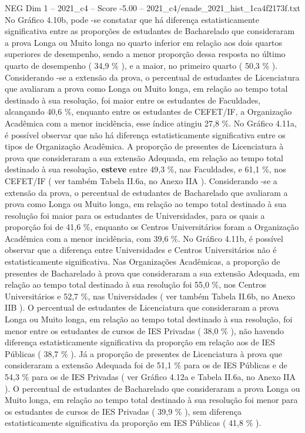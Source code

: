 \begin{textsample}{NEG Dim 1 – 2021\_c4 – Score -5.00 – 2021\_c4/enade\_2021\_hist\_1ca4f2173f.txt}
No Gráfico 4.10b, pode -se constatar que há diferença estatisticamente significativa entre as proporções de estudantes de Bacharelado que consideraram a prova Longa ou Muito longa no quarto inferior em relação aos dois quartos superiores de desempenho, sendo a menor proporção dessa resposta no último quarto de desempenho ( 34,9 \% ), e a maior, no primeiro quarto ( 50,3 \% ).
Considerando -se a extensão da prova, o percentual de estudantes de Licenciatura que avaliaram a prova como Longa ou Muito longa, em relação ao tempo total destinado à sua resolução, foi maior entre os estudantes de Faculdades, alcançando 40,6 \%, enquanto entre os estudantes de CEFET/IF, a Organização Acadêmica com a menor incidência, esse índice atingiu 27,8 \%.
No Gráfico 4.11a, é possível observar que não há diferença estatisticamente significativa entre os tipos de Organização Acadêmica.
A proporção de presentes de Licenciatura à prova que consideraram a sua extensão Adequada, em relação ao tempo total destinado à sua resolução, \textbf{esteve} entre 49,3 \%, nas Faculdades, e 61,1 \%, nos CEFET/IF ( ver também Tabela II.6a, no Anexo IIA ).
Considerando -se a extensão da prova, o percentual de estudantes de Bacharelado que avaliaram a prova como Longa ou Muito longa, em relação ao tempo total destinado à sua resolução foi maior para os estudantes de Universidades, para os quais a proporção foi de 41,6 \%, enquanto os Centros Universitários foram a Organização Acadêmica com a menor incidência, com 39,6 \%.
No Gráfico 4.11b, é possível observar que a diferença entre Universidades e Centros Universitários não é estatisticamente significativa.
Nas Organizações Acadêmicas, a proporção de presentes de Bacharelado à prova que consideraram a sua extensão Adequada, em relação ao tempo total destinado à sua resolução foi 55,0 \%, nos Centros Universitários e 52,7 \%, nas Universidades ( ver também Tabela II.6b, no Anexo IIB ).
O percentual de estudantes de Licenciatura que consideraram a prova Longa ou Muito longa, em relação ao tempo total destinado à sua resolução, foi menor entre os estudantes de cursos de IES Privadas ( 38,0 \% ), não havendo diferença estatisticamente significativa da proporção em relação aos de IES Públicas ( 38,7 \% ).
Já a proporção de presentes de Licenciatura à prova que consideraram a extensão Adequada foi de 51,1 \% para os de IES Públicas e de 54,3 \% para os de IES Privadas ( ver Gráfico 4.12a e Tabela II.6a, no Anexo IIA ).
O percentual de estudantes de Bacharelado que consideraram a prova Longa ou Muito longa, em relação ao tempo total destinado à sua resolução foi menor para os estudantes de cursos de IES Privadas ( 39,9 \% ), sem diferença estatisticamente significativa da proporção em IES Públicas ( 41,8 \% ).

\end{textsample}
